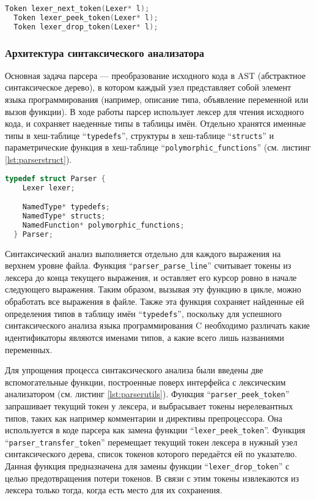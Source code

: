 \begin{lstlisting}[language=c, caption={Интерфейс между парсером и лексером}, label={lst:parsertolexer}]
  Token lexer_next_token(Lexer* l);
  Token lexer_peek_token(Lexer* l);
  Token lexer_drop_token(Lexer* l);
\end{lstlisting}

\subsubsection{Архитектура синтаксического анализатора}

Основная задача парсера --- преобразование исходного кода в AST (абстрактное синтаксическое дерево), в котором каждый узел представляет собой элемент языка программирования (например, описание типа, объявление переменной или вызов функции). В ходе работы парсер использует лексер для чтения исходного кода, и сохраняет наеденные типы в таблицы имён.
Отдельно хранятся именные типы в хеш-таблице ``\texttt{typedefs}'', структуры в хеш-таблице ``\texttt{structs}'' и параметрические функция
в хеш-таблице ``\texttt{polymorphic_functions}'' (см. листинг \ref{lst:parserstruct}).

\begin{lstlisting}[language=c, caption={Упрощённая структура парсера}, label={lst:parserstruct}]
  typedef struct Parser {
    Lexer lexer;

    NamedType* typedefs;
    NamedType* structs;
    NamedFunction* polymorphic_functions;
  } Parser;
\end{lstlisting}

Синтаксический анализ выполняется отдельно для каждого выражения на верхнем уровне файла.
Функция ``\texttt{parser_parse_line}'' считывает токены из лексера до конца текущего выражения, и оставляет его курсор ровно в начале следующего выражения.
Таким образом, вызывая эту функцию в цикле, можно обработать все выражения в файле.
Также эта функция сохраняет найденные ей определения типов в таблицу имён ``\texttt{typedefs}'', поскольку для успешного синтаксического анализа языка программирования C необходимо различать какие идентификаторы являются именами типов, а какие всего лишь названиями переменных.

Для упрощения процесса синтаксического анализа были введены две вспомогательные функции, построенные поверх интерфейса с лексическим анализатором (см. листинг \ref{lst:parserutils}).
Функция ``\texttt{parser_peek_token}'' запрашивает текущий токен у лексера, и выбрасывает токены нерелевантных типов, таких как например комментарии и директивы препроцессора. Она используется в коде парсера как замена функции ``\texttt{lexer_peek_token}''.
Функция ``\texttt{parser_transfer_token}'' перемещает текущий токен лексера в нужный узел синтаксического дерева, список токенов которого передаётся ей по указателю.
Данная функция предназначена для замены функции ``\texttt{lexer_drop_token}'' с целью предотвращения потери токенов. В связи с этим токены извлекаются из лексера только тогда, когда есть место для их сохранения.

